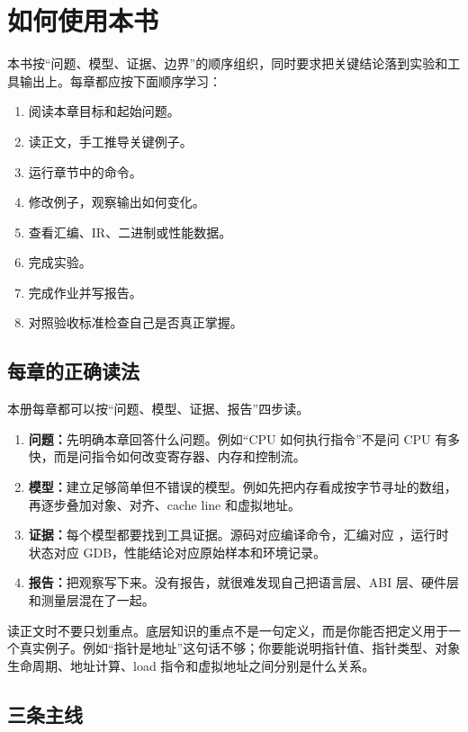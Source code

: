 \chapter*{如何使用本书}

本书按“问题、模型、证据、边界”的顺序组织，同时要求把关键结论落到实验和工具输出上。每章都应按下面顺序学习：

\begin{enumerate}
  \item 阅读本章目标和起始问题。
  \item 读正文，手工推导关键例子。
  \item 运行章节中的命令。
  \item 修改例子，观察输出如何变化。
  \item 查看汇编、IR、二进制或性能数据。
  \item 完成实验。
  \item 完成作业并写报告。
  \item 对照验收标准检查自己是否真正掌握。
\end{enumerate}

\section*{每章的正确读法}

本册每章都可以按“问题、模型、证据、报告”四步读。

\begin{enumerate}
  \item \textbf{问题：}先明确本章回答什么问题。例如“CPU 如何执行指令”不是问 CPU 有多快，而是问指令如何改变寄存器、内存和控制流。
  \item \textbf{模型：}建立足够简单但不错误的模型。例如先把内存看成按字节寻址的数组，再逐步叠加对象、对齐、cache line 和虚拟地址。
  \item \textbf{证据：}每个模型都要找到工具证据。源码对应编译命令，汇编对应 ，运行时状态对应 GDB，性能结论对应原始样本和环境记录。
  \item \textbf{报告：}把观察写下来。没有报告，就很难发现自己把语言层、ABI 层、硬件层和测量层混在了一起。
\end{enumerate}

读正文时不要只划重点。底层知识的重点不是一句定义，而是你能否把定义用于一个真实例子。例如“指针是地址”这句话不够；你要能说明指针值、指针类型、对象生命周期、地址计算、load 指令和虚拟地址之间分别是什么关系。

\section*{三条主线}

